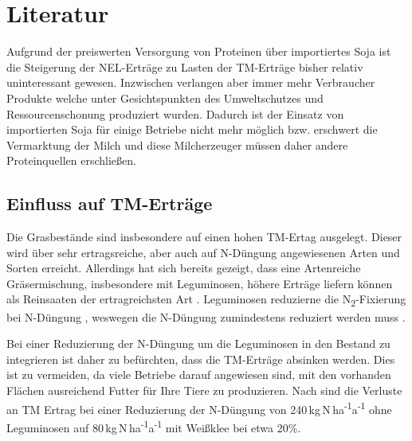 
\section{Literatur}
\label{sec:Literatur}

Aufgrund der preiswerten Versorgung von Proteinen über importiertes Soja ist die Steigerung der \ac{NEL}-Erträge zu Lasten der \ac{TM}-Erträge bisher relativ uninteressant gewesen.
Inzwischen verlangen aber immer mehr Verbraucher Produkte welche unter Gesichtspunkten des Umweltschutzes und Ressourcenschonung produziert wurden.
Dadurch ist der Einsatz von importierten Soja für einige Betriebe nicht mehr möglich bzw. erschwert die Vermarktung der Milch und diese Milcherzeuger müssen daher andere Proteinquellen erschließen.

\subsection{Einfluss auf \acl{TM}-Erträge}
\label{subsec:TM}

Die Grasbestände sind insbesondere auf einen hohen \ac{TM}-Ertag ausgelegt.
Dieser wird über sehr ertragsreiche, aber auch auf N-Düngung angewiesenen Arten und Sorten erreicht.
Allerdings hat sich bereits gezeigt, dass eine Artenreiche Gräsermischung, insbesondere mit Leguminosen, höhere Erträge liefern können als Reinsaaten der ertragreichsten Art \parencite{nyfeler2009strong}.
Leguminosen reduzierne die N\textsubscript{2}-Fixierung bei N-Düngung \parencite{ledgard2001nitrogen}, weswegen die N-Düngung zumindestens reduziert werden muss \parencite[34]{weggler2050leguminosen}.

Bei einer Reduzierung der N-Düngung um die Leguminosen in den Bestand zu integrieren ist daher zu befürchten, dass die \ac{TM}-Erträge absinken werden.
Dies ist zu vermeiden, da viele Betriebe darauf angewiesen sind, mit den vorhanden Flächen ausreichend Futter für Ihre Tiere zu produzieren.
Nach \textcite[11]{engel2013protein} sind die Verluste an \ac{TM} Ertrag bei einer Reduzierung der N-Düngung von 240\,kg\,N\,ha\textsuperscript{-1}a\textsuperscript{-1} ohne Leguminosen auf 80\,kg\,N\,ha\textsuperscript{-1}a\textsuperscript{-1} mit Weißklee bei etwa 20\%.

